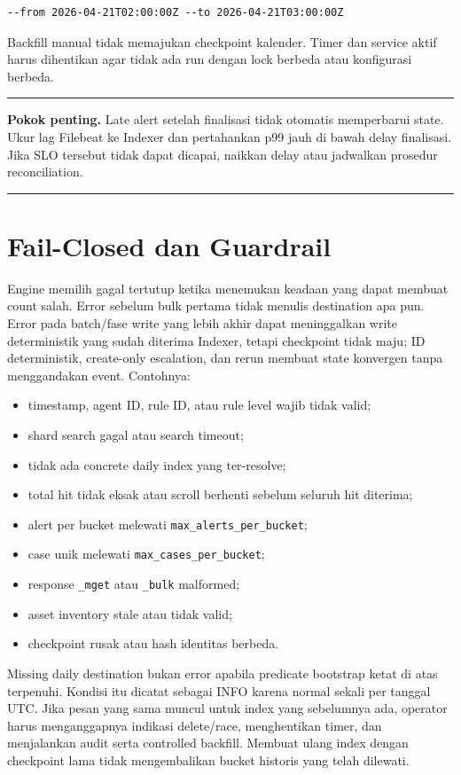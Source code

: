 \documentclass[11pt,a4paper,oneside]{report}
\DeclareRobustCommand{\code}[1]{\nolinkurl{#1}}
\newenvironment{keypoint}
  {\begin{center}\begin{minipage}{0.92\textwidth}\color{WazuhDark}\hrule\vspace{7pt}\textbf{Pokok penting.} }
  {\vspace{7pt}\hrule\end{minipage}\end{center}}
\begin{document}
\begin{lstlisting}
--from 2026-04-21T02:00:00Z --to 2026-04-21T03:00:00Z
\end{lstlisting}

Backfill manual tidak memajukan checkpoint kalender. Timer dan service aktif harus
dihentikan agar tidak ada run dengan lock berbeda atau konfigurasi berbeda.

\begin{keypoint}
Late alert setelah finalisasi tidak otomatis memperbarui state. Ukur lag Filebeat
ke Indexer dan pertahankan p99 jauh di bawah delay finalisasi. Jika SLO tersebut
tidak dapat dicapai, naikkan delay atau jadwalkan prosedur reconciliation.
\end{keypoint}

\chapter{Fail-Closed dan Guardrail}

Engine memilih gagal tertutup ketika menemukan keadaan yang dapat membuat count
salah. Error sebelum bulk pertama tidak menulis destination apa pun. Error pada
batch/fase write yang lebih akhir dapat meninggalkan write deterministik yang sudah
diterima Indexer, tetapi checkpoint tidak maju; ID deterministik, create-only
escalation, dan rerun membuat state konvergen tanpa menggandakan event. Contohnya:

\begin{itemize}
  \item timestamp, agent ID, rule ID, atau rule level wajib tidak valid;
  \item shard search gagal atau search timeout;
  \item tidak ada concrete daily index yang ter-resolve;
  \item total hit tidak eksak atau scroll berhenti sebelum seluruh hit diterima;
  \item alert per bucket melewati \code{max\_alerts\_per\_bucket};
  \item case unik melewati \code{max\_cases\_per\_bucket};
  \item response \code{\_mget} atau \code{\_bulk} malformed;
  \item asset inventory stale atau tidak valid;
  \item checkpoint rusak atau hash identitas berbeda.
\end{itemize}

Missing daily destination bukan error apabila predicate bootstrap ketat di atas
terpenuhi. Kondisi itu dicatat sebagai INFO karena normal sekali per tanggal UTC.
Jika pesan yang sama muncul untuk index yang sebelumnya ada, operator harus
menganggapnya indikasi delete/race, menghentikan timer, dan menjalankan audit serta
controlled backfill. Membuat ulang index dengan checkpoint lama tidak mengembalikan
bucket historis yang telah dilewati.
\end{document}
